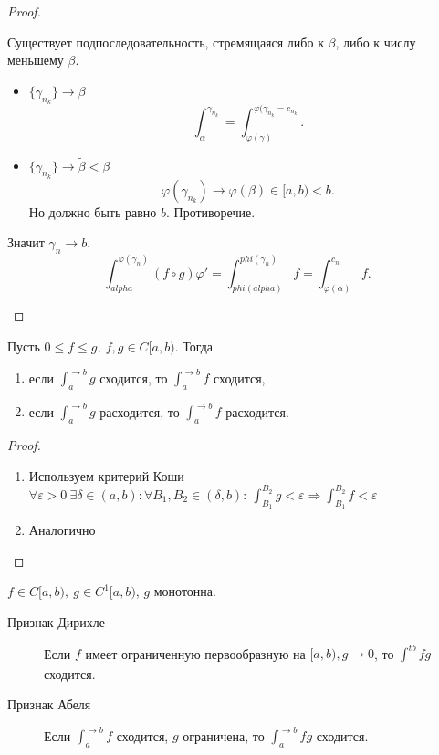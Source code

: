 \begin{prop}
\begin{description}
\begin{proof}
\begin{description}
\begin{enumerate}
			Существует подпоследовательность, стремящаяся либо к $  \beta $, либо к числу меньшему $ \beta $.
			\begin{itemize}
			    \item $ \{ \gamma_{n_k}\} \to \beta $
				    \[
					\int_{\alpha}^{ \gamma_{n_k}} = \int_{ \varphi (\gamma)}^{ \varphi (\gamma_{n_k}=c_{n_k}}
				    .\]
			    \item $ \{\gamma_{n_k}\} \to \tilde\beta < \beta  $
				    \[
					\varphi ( \gamma_{n_k} ) \to  \varphi ( \beta) \in  [ a, b) < b
				    .\]
				    Но должно быть равно $ b$. Противоречие.
			    \end{itemize}
			    Значит $ \gamma_n \to  b $.
			    \[
				\int_{ alpha}^{ \varphi (\gamma_n)} (f \circ g) \varphi ' = \int_{phi(alpha)}^{phi(\gamma_n)} f = \int_{ \varphi ( \alpha )}^{c_n} f
			    .\]
		    \end{enumerate}
	    \end{description}
	\end{proof}
	    \end{description}
    \end{prop}
    \begin{thm}
	Пусть $ 0 \le  f \le g,  ~ f, g \in  C[a, b)$. Тогда
	\begin{enumerate}
	    \item  если $ \int_{a }^{ \to  b} g  $ сходится, то $ \int_{a}^{  \to  b} f $ сходится,
	    \item  если $ \int_{a }^{ \to  b} g  $ расходится, то $ \int_{a}^{  \to  b} f $ расходится.
	\end{enumerate}
    \end{thm}
    \begin{proof}
	$ $
	\begin{enumerate}
	    \item
		Используем критерий Коши $ \forall  \varepsilon >0 ~ \exists  \delta  \in  (a, b): \forall  B_1, B_2 \in  ( \delta  , b): ~ \int_{B_1}^{B_2}g < \varepsilon  \Longrightarrow \int_{B_1}^{B_2} f < \varepsilon     $
	    \item Аналогично
	\end{enumerate}
    \end{proof}
    \begin{thm}
	$ f \in C[a, b), ~ g \in C^{1}[a, b)$, $ g$ монотонна.
	\begin{description}
	    \item[Признак Дирихле] Если $ f$ имеет ограниченную первообразную на  $ [a, b), g \to  0$, то $ \int_{}^{ t b}fg  $ сходится.
	    \item[Признак Абеля] Если $  \int_{a}^{ \to  b}  f $ сходится, $ g$  ограничена, то $ \int_{a}^{ \to b} fg   $ сходится.
	\end{description}
    \end{thm}
